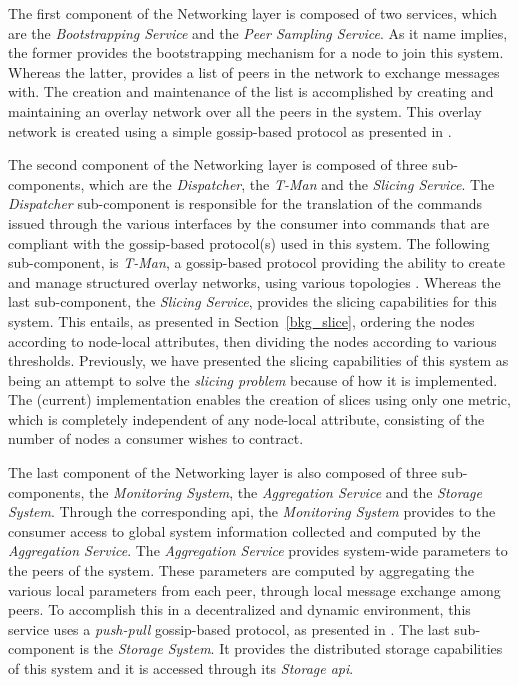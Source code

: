 \documentclass[12pt, titlepage]{uo_temp}
\begin{document}
     The first component of the Networking layer is composed of two services, which are
     the \emph{Bootstrapping Service} and the \emph{Peer Sampling Service}. As it name
     implies, the former provides the bootstrapping mechanism for a node to join this
     system. Whereas the latter, provides a list of peers in the network to exchange
     messages with. The creation and maintenance of the list is accomplished by creating
     and maintaining an overlay network over all the peers in the system. This overlay
     network is created using a simple gossip-based protocol as presented in
     \cite{pss}.

     The second component of the Networking layer is composed of three sub-components,
     which are the \emph{Dispatcher}, the \emph{T-Man} and the \emph{Slicing Service}. The
     \emph{Dispatcher} sub-component is responsible for the translation of the commands
     issued through the various interfaces by the consumer into commands that are
     compliant with the gossip-based protocol(s) used in this system. The following
     sub-component, is \emph{T-Man}, a gossip-based protocol providing the ability to
     create and manage structured overlay networks, using various topologies
     \cite{jelasity2009t}. Whereas the last sub-component, the \emph{Slicing Service},
     provides the slicing capabilities for this system. This entails, as presented in
     Section~\ref{bkg_slice}, ordering the nodes according to node-local attributes, then
     dividing the nodes according to various thresholds. Previously, we have presented the
     slicing capabilities of this system as being an attempt to solve the \emph{slicing
       problem} because of how it is implemented. The (current) implementation enables the
     creation of slices using only one metric, which is completely independent of any
     node-local attribute, consisting of the number of nodes a consumer wishes to
     contract.
      
     The last component of the Networking layer is also composed of three sub-components,
     the \emph{Monitoring System}, the \emph{Aggregation Service} and the \emph{Storage
       System}. Through the corresponding \gls{api}, the \emph{Monitoring System} provides
     to the consumer access to global system information collected and computed by the
     \emph{Aggregation Service}. The \emph{Aggregation Service} provides system-wide
     parameters to the peers of the system. These parameters are computed by aggregating
     the various local parameters from each peer, through local message exchange among
     peers. To accomplish this in a decentralized and dynamic environment, this service
     uses a \emph{push-pull} gossip-based protocol, as presented in
     \cite{jelasity2005gossip}. The last sub-component is the \emph{Storage System}. It
     provides the distributed storage capabilities of this system and it is accessed
     through its \emph{Storage \gls{api}}.
\end{document}
